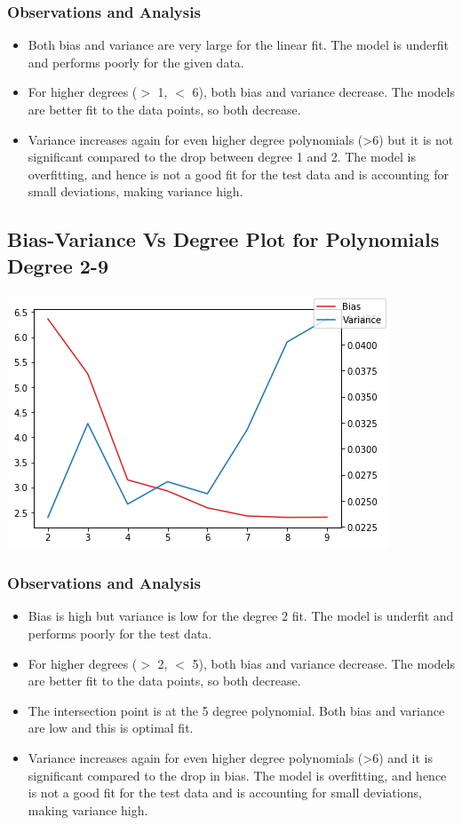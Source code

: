 \documentclass{article}
\begin{document}
\subsubsection{Observations and Analysis}
\begin{itemize}
\item Both bias and variance are very large for the linear fit. The model is underfit and performs poorly for the given data.
\item For higher degrees ($>$ 1, $<$ 6), both bias and variance decrease. The models are better fit to the data points, so both decrease.
\item Variance increases again for even higher degree polynomials (>6) but it is not significant compared to the drop between degree  1 and 2. The model is overfitting, and hence is not a good fit for the test data and is accounting for small deviations, making variance high.
\end{itemize}
\subsection{Bias-Variance Vs Degree Plot for Polynomials Degree 2-9}
\includegraphics[scale=.9]{images/2-9.png}
\subsubsection{Observations and Analysis}
\begin{itemize}
\item Bias is high but variance is low for the degree 2 fit. The model is underfit and performs poorly for the test data.
\item For higher degrees ($>$ 2, $<$ 5), both bias and variance decrease. The models are better fit to the data points, so both decrease.
\item The intersection point is at the 5 degree polynomial. Both bias and variance are low and this is optimal fit.
\item Variance increases again for even higher degree polynomials (>6) and it is significant compared to the drop in bias. The model is overfitting, and hence is not a good fit for the test data and is accounting for small deviations, making variance high.
\end{itemize}
\end{document}
